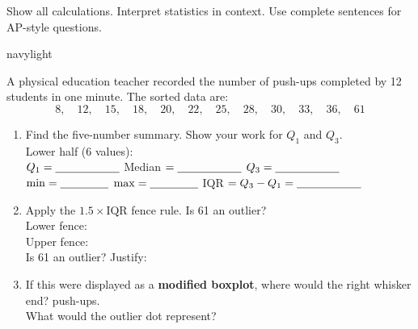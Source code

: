 \documentclass[10pt]{article}
\begin{document}
\namedateperiod

\vspace{0.10in}

\begin{tcolorbox}[colback=sky, colframe=navy, boxrule=0.8pt, arc=2mm,
    left=3mm, right=3mm, top=1.5mm, bottom=1.5mm]
\small Show all calculations. Interpret statistics in context. Use complete
sentences for AP-style questions.
\end{tcolorbox}

\vspace{0.12in}

\begin{blurbbox}{navylight}
\small

A physical education teacher recorded the number of push-ups completed by
12 students in one minute. The sorted data are:
\[8,\quad 12,\quad 15,\quad 18,\quad 20,\quad 22,\quad 25,\quad 28,\quad 30,\quad 33,\quad 36,\quad 61\]

\vspace{0.10in}

\begin{enumerate}[leftmargin=1.5em, itemsep=8pt]

  \item Find the five-number summary. Show your work for $Q_1$ and $Q_3$.\\[5pt]
        Lower half (6 values): \blank{8cm}\\[4pt]
        $Q_1 = \blank{2cm}$ \quad Median $= \blank{2cm}$ \quad $Q_3 = \blank{2cm}$\\[4pt]
        $\min = \blank{1.5cm}$ \quad $\max = \blank{1.5cm}$ \quad
        IQR $= Q_3 - Q_1 = \blank{2cm}$

  \item Apply the $1.5 \times \text{IQR}$ fence rule. Is 61 an outlier?\\[5pt]
        Lower fence: \blank{6cm}\\[4pt]
        Upper fence: \blank{6cm}\\[4pt]
        Is 61 an outlier? \blank{2cm} \quad Justify: \blank{6cm}

  \item If this were displayed as a \textbf{modified boxplot}, where would the
        right whisker end? \blank{3cm} push-ups. \\[4pt]
        What would the outlier dot represent? \blank{8cm}

\end{enumerate}

\end{blurbbox}
\end{document}
